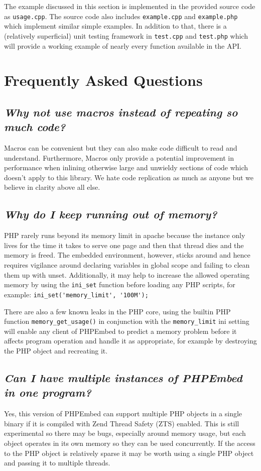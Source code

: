 \documentclass[11pt,titlepage]{article}
\begin{document}
The example discussed in this section is implemented in the provided source code as \verb|usage.cpp|. The source code also includes \verb|example.cpp| and \verb|example.php| which implement similar simple examples. In addition to that, there is a (relatively superficial) unit testing framework in \verb|test.cpp| and \verb|test.php| which will provide a working example of nearly every function available in the API. 

\section{Frequently Asked Questions}

\subsection{\emph{Why not use macros instead of repeating so much code?}}
Macros can be convenient but they can also make code difficult to read and understand. Furthermore, Macros only provide a potential improvement in performance when inlining otherwise large and unwieldy sections of code which doesn't apply to this library. We hate code replication as much as anyone but we believe in clarity above all else.

\subsection{\emph{Why do I keep running out of memory?}}
PHP rarely runs beyond its memory limit in apache because the instance only lives for the time it takes to serve one page and then that thread dies and the memory is freed. The embedded environment, however, sticks around and hence requires vigilance around declaring variables in global scope and failing to clean them up with unset. Additionally, it may help to increase the allowed operating memory by using the \verb|ini_set| function before loading any PHP scripts, for example: \verb|ini_set('memory_limit', '100M');|

There are also a few known leaks in the PHP core, using the builtin PHP function \verb|memory_get_usage()| in conjunction with the \verb|memory_limit| ini setting will enable any client of PHPEmbed to predict a memory problem before it affects program operation and handle it as appropriate, for example by destroying the PHP object and recreating it.

\subsection{\emph{Can I have multiple instances of PHPEmbed in one program?}}
Yes, this version of PHPEmbed can support multiple PHP objects in a single binary if it is compiled with Zend Thread Safety (ZTS) enabled. This is still experimental so there may be bugs, especially around memory usage, but each object operates in its own memory so they can be used concurrently. If the access to the PHP object is relatively sparse it may be worth using a single PHP object and passing it to multiple threads.
\end{document}

